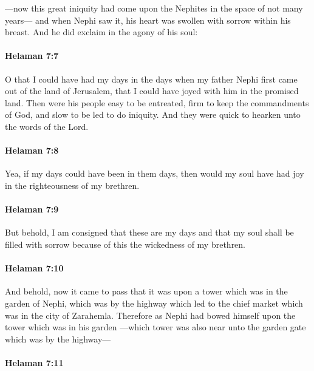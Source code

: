 			---now this great iniquity had come upon the Nephites
			in the space of not many years---
			and when Nephi saw it,
			his heart was swollen with sorrow within his breast.
			And he did exclaim in the agony of his soul:

		\paragraph{Helaman 7:7} %
			\label{HELAMAN-7-7}

			O that I could have had my days in the days
			when my father Nephi first came out of the land of Jerusalem,
			that I could have joyed with him in the promised land.
			Then were his people easy to be entreated,
			firm to keep the commandments of God,
			and slow to be led to do iniquity.
			And they were quick to hearken unto the words of the Lord.

		\paragraph{Helaman 7:8} %
			\label{HELAMAN-7-8}

			Yea, if my days could have been in them days,
			then would my soul have had joy in the righteousness of my brethren.

		\paragraph{Helaman 7:9} %
			\label{HELAMAN-7-9}

			But behold, I am consigned that these are my days
			and that my soul shall be filled with sorrow
			because of this the wickedness of my brethren.

		\paragraph{Helaman 7:10} %
			\label{HELAMAN-7-10}

			And behold, now it came to pass that it was upon a tower
			which was in the garden of Nephi, which was by the highway
			which led to the chief market which was in the city of Zarahemla.
			Therefore as Nephi had bowed himself upon the tower which was in his garden
			---which tower was also near unto the garden gate which was by the highway---

		\paragraph{Helaman 7:11} %
			\label{HELAMAN-7-11}

